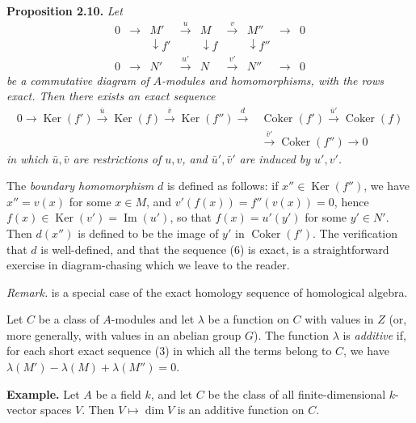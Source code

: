 \noindent\textbf{Proposition 2.10.} \emph{Let}
\[
\begin{array}{ccccccccc}
0&\longrightarrow&M'&\xrightarrow{u}&M&\xrightarrow{v}&M''&\longrightarrow&0\\
&&\downarrow f'&&\downarrow f&&\downarrow f''&&\\
0&\longrightarrow&N'&\xrightarrow{u'}&N&\xrightarrow{v'}&N''&\longrightarrow&0
\end{array}
\]
\emph{be a commutative diagram of \(A\)-modules and homomorphisms, with the rows exact. Then there exists an exact sequence}
\[
\begin{split}
0\longrightarrow\operatorname{Ker}(f')\xrightarrow{\bar u}\operatorname{Ker}(f)\xrightarrow{\bar v}\operatorname{Ker}(f'')\xrightarrow{d}{}&
\operatorname{Coker}(f')\xrightarrow{\bar u'}\operatorname{Coker}(f)\\
&\xrightarrow{\bar v'}\operatorname{Coker}(f'')\longrightarrow0
\end{split}\tag{6}
\]
\emph{in which \(\bar u,\bar v\) are restrictions of \(u,v\), and \(\bar u',\bar v'\) are induced by \(u',v'\).}

The \emph{boundary homomorphism} \(d\) is defined as follows: if \(x''\in\operatorname{Ker}(f'')\), we have \(x''=v(x)\) for some \(x\in M\), and \(v'(f(x))=f''(v(x))=0\), hence \(f(x)\in\operatorname{Ker}(v')=\operatorname{Im}(u')\), so that \(f(x)=u'(y')\) for some \(y'\in N'\). Then \(d(x'')\) is defined to be the image of \(y'\) in \(\operatorname{Coker}(f')\). The verification that \(d\) is well-defined, and that the sequence (6) is exact, is a straightforward exercise in diagram-chasing which we leave to the reader. \proofbox

\noindent\emph{Remark.}  is a special case of the exact homology sequence of homological algebra.

Let \(C\) be a class of \(A\)-modules and let \(\lambda\) be a function on \(C\) with values in \(Z\) (or, more generally, with values in an abelian group \(G\)). The function \(\lambda\) is \emph{additive} if, for each short exact sequence (3) in which all the terms belong to \(C\), we have \(\lambda(M')-\lambda(M)+\lambda(M'')=0\).

\noindent\textbf{Example.} Let \(A\) be a field \(k\), and let \(C\) be the class of all finite-dimensional \(k\)-vector spaces \(V\). Then \(V\mapsto\dim V\) is an additive function on \(C\).
